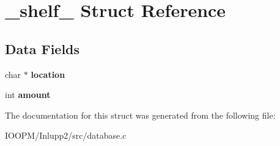 \hypertarget{struct__shelf__}{}\section{\+\_\+shelf\+\_\+ Struct Reference}
\label{struct__shelf__}
\subsection*{Data Fields}
\begin{DoxyCompactItemize}
\item 
\hypertarget{struct__shelf___a6a0d5603410d5eda93c0ff341966cce1}{}char $\ast$ {\bfseries location}\label{struct__shelf___a6a0d5603410d5eda93c0ff341966cce1}

\item 
\hypertarget{struct__shelf___a14236de313193a14b4dbdf442bcf2bb9}{}int {\bfseries amount}\label{struct__shelf___a14236de313193a14b4dbdf442bcf2bb9}

\end{DoxyCompactItemize}


The documentation for this struct was generated from the following file\+:\begin{DoxyCompactItemize}
\item 
I\+O\+O\+P\+M/\+Inlupp2/src/database.\+c\end{DoxyCompactItemize}
